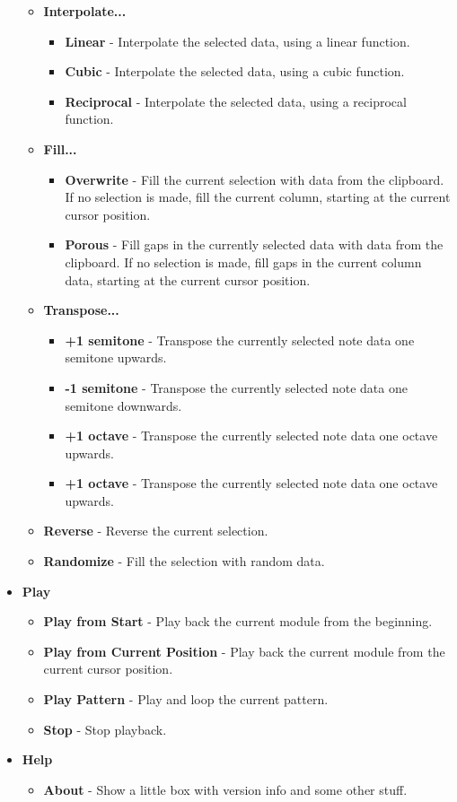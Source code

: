 \documentclass[12pt]{report}	%
\begin{document}
\begin{itemize}
\begin{itemize}
\item \textbf{Interpolate...}
\begin{itemize}
\item \textbf{Linear} - Interpolate the selected data, using a linear function.
\item \textbf{Cubic} - Interpolate the selected data, using a cubic function.
\item \textbf{Reciprocal} - Interpolate the selected data, using a reciprocal function.
\end{itemize}
\item \textbf{Fill...}
\begin{itemize}
\item \textbf{Overwrite} - Fill the current selection with data from the clipboard. If no selection is made, fill the current column, starting at the current cursor position.
\item \textbf{Porous} - Fill gaps in the currently selected data with data from the clipboard. If no selection is made, fill gaps in the current column data, starting at the current cursor position.
\end{itemize}
\item \textbf{Transpose...}
\begin{itemize}
\item \textbf{+1 semitone} - Transpose the currently selected note data one semitone upwards.
\item \textbf{-1 semitone} - Transpose the currently selected note data one semitone downwards.
\item \textbf{+1 octave} - Transpose the currently selected note data one octave upwards.
\item \textbf{+1 octave} - Transpose the currently selected note data one octave upwards.
\end{itemize}
\item \textbf{Reverse} - Reverse the current selection.
\item \textbf{Randomize} - Fill the selection with random data.
\end{itemize}
\item \textbf{Play}
\begin{itemize}
\item \textbf{Play from Start} - Play back the current module from the beginning.
\item \textbf{Play from Current Position} - Play back the current module from the current cursor position.
\item \textbf{Play Pattern} - Play and loop the current pattern.
\item \textbf{Stop} - Stop playback.
\end{itemize}
\item \textbf{Help}
\begin{itemize}
\item \textbf{About} - Show a little box with version info and some other stuff.
\end{itemize}
\end{itemize}
\end{document}
